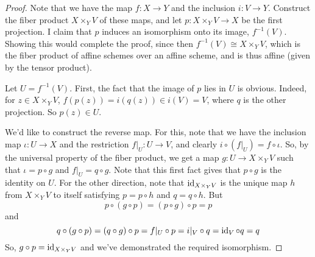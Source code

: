 \begin{proof}
	Note that we have the map $f : X \to Y$ and the inclusion $i : V \to Y$. Construct the fiber product $X \times_Y V$ of these maps, and let $p : X \times_Y V \to X$ be the first projection. I claim that $p$ induces an isomorphism onto its image, $f^{-1}(V)$. Showing this would complete the proof, since then $f^{-1}(V) \cong X \times_Y V$, which is the fiber product of affine schemes over an affine scheme, and is thus affine (given by the tensor product).
	
	Let $U = f^{-1}(V)$. First, the fact that the image of $p$ lies in $U$ is obvious. Indeed, for $z \in X \times_Y V$, $f(p(z)) = i(q(z)) \in i(V) = V$, where $q$ is the other projection. So $p(z) \in U$.
	
	We'd like to construct the reverse map. For this, note that we have the inclusion map $\iota : U \to X$ and the restriction $f|_U : U \to V$, and clearly $i \circ (f|_U) = f \circ \iota$. So, by the universal property of the fiber product, we get a map $g : U \to X \times_Y V$ such that $\iota = p \circ g$ and $f|_U = q \circ g$. Note that this first fact gives that $p \circ g$ is the identity on $U$. For the other direction, note that $\operatorname{id}_{X \times_Y V}$ is the unique map $h$ from $X \times_Y V$ to itself satisfying $p = p \circ h$ and $q = q \circ h$. But
	\[ p \circ (g \circ p) = (p \circ g) \circ p = p \]
	and
	\[ q \circ (g \circ p) = (q \circ g) \circ p = f|_U \circ p = i|_V \circ q = \operatorname{id}_V \circ q = q \]
	So, $g \circ p = \operatorname{id}_{X \times_Y V}$ and we've demonstrated the required isomorphism.
\end{proof}
